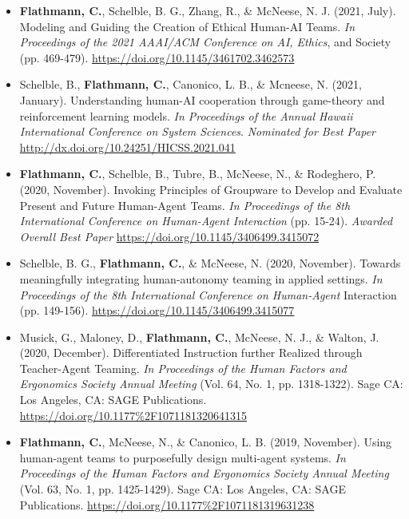 \begin{itemize}[align=left, labelwidth=3em,]
\item[C.8] \textbf{Flathmann, C.}, Schelble, B. G., Zhang, R., \& McNeese, N. J. (2021, July). Modeling and Guiding the Creation of Ethical Human-AI Teams. \textit{In Proceedings of the 2021 AAAI/ACM Conference on AI, Ethics}, and Society (pp. 469-479). \url{https://doi.org/10.1145/3461702.3462573} \\

\item[\faTrophy C.7] Schelble, B., \textbf{Flathmann, C.}, Canonico, L. B., \& Mcneese, N. (2021, January). Understanding human-AI cooperation through game-theory and reinforcement learning models. \textit{In Proceedings of the Annual Hawaii International Conference on System Sciences}. \textit{Nominated for Best Paper} \url{http://dx.doi.org/10.24251/HICSS.2021.041} \\

\item[\faTrophy C.6] \textbf{Flathmann, C.}, Schelble, B., Tubre, B., McNeese, N., \& Rodeghero, P. (2020, November). Invoking Principles of Groupware to Develop and Evaluate Present and Future Human-Agent Teams. \textit{In Proceedings of the 8th International Conference on Human-Agent Interaction} (pp. 15-24). \textit{Awarded Overall Best Paper} \url{https://doi.org/10.1145/3406499.3415072} \\

\item[C.5] Schelble, B. G., \textbf{Flathmann, C.}, \& McNeese, N. (2020, November). Towards meaningfully integrating human-autonomy teaming in applied settings. \textit{In Proceedings of the 8th International Conference on Human-Agent} Interaction (pp. 149-156). \url{https://doi.org/10.1145/3406499.3415077} \\

\item[C.4] Musick, G., Maloney, D., \textbf{Flathmann, C.}, McNeese, N. J., \& Walton, J. (2020, December). Differentiated Instruction further Realized through Teacher-Agent Teaming. \textit{In Proceedings of the Human Factors and Ergonomics Society Annual Meeting} (Vol. 64, No. 1, pp. 1318-1322). Sage CA: Los Angeles, CA: SAGE Publications. \url{https://doi.org/10.1177\%2F1071181320641315} \\

\item[C.3] \textbf{Flathmann, C.}, McNeese, N., \& Canonico, L. B. (2019, November). Using human-agent teams to purposefully design multi-agent systems. \textit{In Proceedings of the Human Factors and Ergonomics Society Annual Meeting} (Vol. 63, No. 1, pp. 1425-1429). Sage CA: Los Angeles, CA: SAGE Publications. \url{https://doi.org/10.1177\%2F1071181319631238} \\


\end{itemize}
